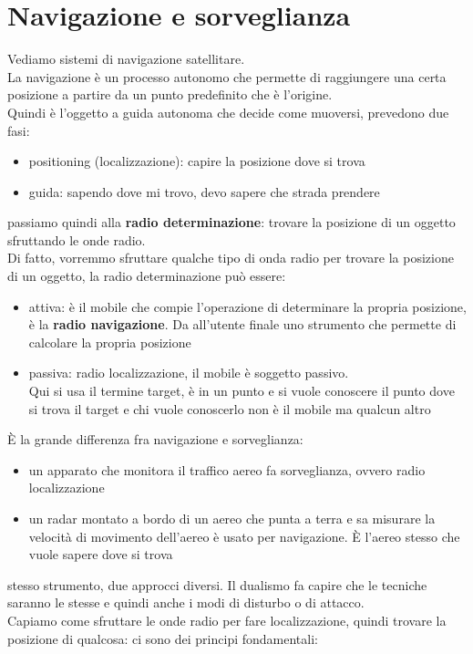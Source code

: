 \documentclass[oneside, 12pt]{extbook}
\begin{document}
\section{Navigazione e sorveglianza}
Vediamo sistemi di navigazione satellitare.
\\La navigazione è un processo autonomo che permette di raggiungere una certa posizione a partire da un punto predefinito che è l'origine.
\\Quindi è l'oggetto a guida autonoma che decide come muoversi, prevedono due fasi:
\begin{itemize}
	\item positioning (localizzazione): capire la posizione dove si trova
	\item guida: sapendo dove mi trovo, devo sapere che strada prendere
\end{itemize}
passiamo quindi alla \textbf{radio determinazione}: trovare la posizione di un oggetto sfruttando le onde radio.
\\Di fatto, vorremmo sfruttare qualche tipo di onda radio per trovare la posizione di un oggetto, la radio determinazione può essere:
\begin{itemize}
	\item attiva: è il mobile che compie l'operazione di determinare la propria posizione, è la \textbf{radio navigazione}. Da all'utente finale uno strumento che permette di calcolare la propria posizione
	\item passiva: radio localizzazione, il mobile è soggetto passivo.
	\\Qui si usa il termine target, è in un punto e si vuole conoscere il punto dove si trova il target e chi vuole conoscerlo non è il mobile ma qualcun altro
\end{itemize}
È la grande differenza fra navigazione e sorveglianza:
\begin{itemize}
	\item un apparato che monitora il traffico aereo fa sorveglianza, ovvero radio localizzazione
	\item un radar montato a bordo di un aereo che punta a terra e sa misurare la velocità di movimento dell'aereo è usato per navigazione. È l'aereo stesso che vuole sapere dove si trova
\end{itemize}
stesso strumento, due approcci diversi. Il dualismo fa capire che le tecniche saranno le stesse e quindi anche i modi di disturbo o di attacco.\\
Capiamo come sfruttare le onde radio per fare localizzazione, quindi trovare la posizione di qualcosa: ci sono dei principi fondamentali:
\end{document}
